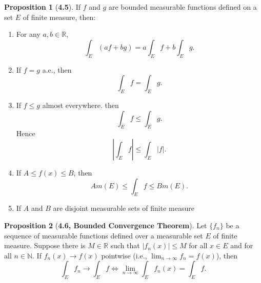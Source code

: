 \documentclass[12pt]{article}
\newcommand{\R}{\mathbb{R}}
\newcommand{\N}{\mathbb{N}}
\theoremstyle{definition}
\newtheorem*{prop}{Proposition}
\begin{document}
\begin{prop}[\textbf{4.5}]

  If \( f \) and \( g \) are bounded measurable functions defined on a set \( E \) of finite measure, then:
    \begin{enumerate}[label = \roman{*}.]
      \item For any \( a,b \in \R \), \[ \int_{E} (af + bg) = a \int_{E} f + b \int_{E} g. \]
      \item If \( f = g \) a.e., then 
        \[
            \int_{E} f = \int_{E} g.
        \]
      \item If \( f \leq g \) almost everywhere. then 
        \[
            \int_{E} f \leq \int_{E} g. 
        \]
      Hence 
        \[
            \left| \int_{E} f \right| \leq \int_{E} \left| f \right|.
        \]
      \item If \( A \leq f(x) \leq B \), then 
        \[
            Am(E) \leq \int_{E} f \leq Bm(E).
        \]
      \item If \( A \) and \( B \) are disjoint measurable sets of finite measure
    \end{enumerate}
  
\end{prop}

\begin{prop}[\textbf{4.6, Bounded Convergence Theorem}]

  Let \( \{ f_n \} \) be a sequence of measurable functions defined over a measurable set \( E \) of finite measure. Suppose there is \( M \in \R  \) such that \( |f_n(x) | \leq M \) for all \( x \in E \) and for all \( n \in \N \). If \( f_n(x) \to f(x) \) pointwise (i.e., \( \displaystyle \lim_{n \to \infty} f_n = f(x) \)), then 
    \[
        \int_{E} f_n \to \int_{E} f \Leftrightarrow \lim_{n \to \infty} \int_{E} f_n(x) = \int_{E} f.
    \]
  
\end{prop}
\end{document}
